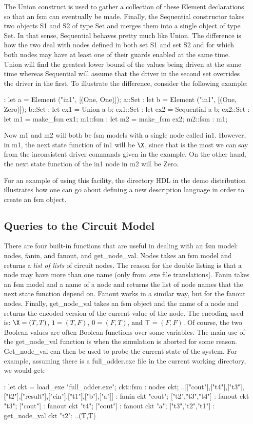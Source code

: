 The Union construct is used to gather a collection of these Element
declarations so that an fsm can eventually be made.
Finally, the Sequential constructor takes two objects S1 and S2 of
type Set and merges them into a single object of type Set.
In that sense, Sequential behaves pretty much like Union.
The difference is how the two deal with nodes defined in both set S1 and set S2
and for which both nodes may have at least one of their guards enabled
at the same time.
Union will find the greatest lower bound of the values being driven
at the same time whereas Sequential will assume that the driver in the
second set overrides the driver in the first.
To illustrate the difference, consider the following example:
\begin{hol}
: let a = Element ("in1", [(One, One)]);
a::Set
: let b = Element ("in1", [(One, Zero)]);
b::Set
: let ex1 = Union a b;
ex1::Set
: let ex2 = Sequential a b;
ex2::Set
: let m1 = make_fsm ex1;
m1::fsm
: let m2 = make_fsm ex2;
m2::fsm
: m1;
\end{hol}
Now m1 and m2 will both be fsm models with a single node called in1.
However, in m1, the next state function of in1 will be $\X$, since that
is the most we can say from the inconsistent driver commands given
in the example.
On the other hand, the next state function of the in1 node in m2 will be Zero.

For an example of using this facility, the directory HDL in the demo
distribution illustrates how one can go about defining a new description
language in order to create an fsm object.

\subsection{Queries to the Circuit Model}

There are four built-in functions that are useful in dealing with
an fsm model: nodes, fanin, and fanout, and get\_node\_val.
Nodes takes an fsm model and returns a {\em list of lists} of circuit nodes.
The reason for the double listing is that a node may have more than
one name (only from .exe file translations).
Fanin takes an fsm model and a name of a node and returns the
list of node names that the next state function depend on.
Fanout works in a similar way, but for the fanout nodes.
Finally, get\_node\_val takes an fsm object and the name of a node
and returns the encoded version of the current value of the node.
The encoding used is: $\X = (T,T)$, $1=(T,F)$, $0=(F,T)$, and $\top=(F,F)$.
Of course, the two Boolean values are often Boolean functions over some
variables.
The main use of the get\_node\_val function is when the simulation
is aborted for some reason.
Get\_node\_val can then be used to probe the current state of the system.
For example, assuming there is a full\_adder.exe file in the current
working directory, we would get:
\begin{hol}
: let ckt = load_exe "full_adder.exe";
ckt::fsm
: nodes ckt;
..[["cout"],["t4"],["t3"],["t2"],["result"],["cin"],["t1"],["b"],["a"]]
: fanin ckt "cout";
["t2","t3","t4"]
: fanout ckt "t3";
["cout"]
: fanout ckt "t4";
["cout"]
: fanout ckt "a";
["t3","t2","t1"]
: get_node_val ckt "t2";
..(T,T)
\end{hol}

